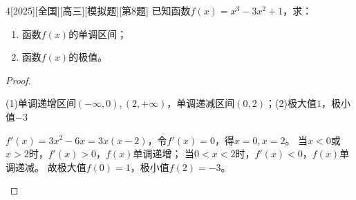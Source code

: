 \documentclass[
noshowanswers,        %
answercolor=red,    %
paper=a4,           %
sectioncolor=cyan,  %
subsectioncolor=cyan,
exercisecolor=orange, %
examplecolor=cyan,    %
bianshicolor=purple  %
]{biscuits}
\begin{document}
\begin{example}{4}[2025][全国][高三][模拟题][第8题]
	已知函数$f(x)=x^3-3x^2+1$，求：
	\begin{enumerate}
		\item 函数$f(x)$的单调区间；
		\item 函数$f(x)$的极值。
	\end{enumerate}
	\begin{proof}
		\begin{answer}
			(1)单调递增区间$(-\infty,0),(2,+\infty)$，单调递减区间$(0,2)$；(2)极大值$1$，极小值$-3$
		\end{answer}
		\begin{solutions}
			$f'(x)=3x^2-6x=3x(x-2)$，令$f'(x)=0$，得$x=0,x=2$。
			当$x<0$或$x>2$时，$f'(x)>0$，$f(x)$单调递增；
			当$0<x<2$时，$f'(x)<0$，$f(x)$单调递减。
			故极大值$f(0)=1$，极小值$f(2)=-3$。
		\end{solutions}
	\end{proof}
\end{example}
\end{document}
